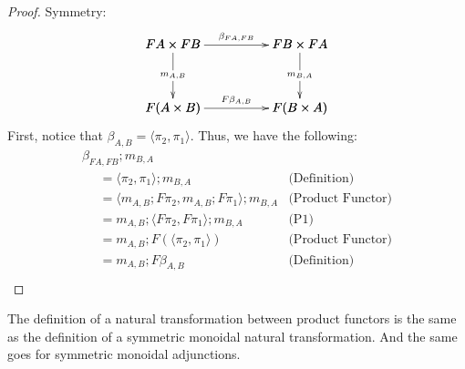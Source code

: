 \begin{proof}
\item[] Symmetry:\\
  \[
  \bfig
  \square|amma|/->`->`->`->/<1000,500>[
    FA \times FB`
    FB \times FA`
    F(A \times B)`
    F(B \times A);
    {\beta}_{FA,FB}`
    m_{A,B}`
    m_{B,A}`
    F{\beta}_{A,B}]
  \efig
  \]
  First, notice that $\beta_{A,B} = \langle \pi_2, \pi_1 \rangle$.  Thus, we have the following:
  \[
  \begin{array}{lll}
    \beta_{FA,FB};m_{B,A}\\
    \,\,\,\,\,\,\,\,=  \langle \pi_2, \pi_1 \rangle;m_{B,A} & \text{(Definition)}\\
    \,\,\,\,\,\,\,\,=  \langle m_{A,B};F\pi_2, m_{A,B};F\pi_1 \rangle;m_{B,A} & \text{(Product Functor)}\\
    \,\,\,\,\,\,\,\,=  m_{A,B};\langle F\pi_2, F\pi_1 \rangle;m_{B,A} & \text{(P1)}\\
    \,\,\,\,\,\,\,\,=  m_{A,B};F(\langle \pi_2, \pi_1 \rangle) & \text{(Product Functor)}\\
    \,\,\,\,\,\,\,\,=  m_{A,B};F\beta_{A,B} & \text{(Definition)}\\
  \end{array}
  \]
\end{proof}
\fi 

The definition of a natural transformation between product functors is
the same as the definition of a symmetric monoidal natural
transformation. And the same goes for symmetric monoidal adjunctions.


